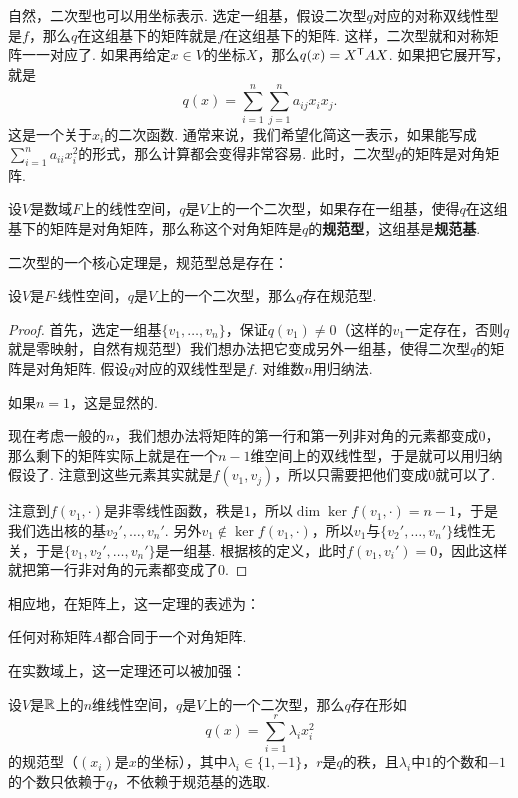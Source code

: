 自然，二次型也可以用坐标表示. 选定一组基，假设二次型$q$对应的对称双线性型是$f$，那么$q$在这组基下的矩阵就是$f$在这组基下的矩阵. 这样，二次型就和对称矩阵一一对应了. 如果再给定$x\in V$的坐标$X$，那么$q(x)=X^{\mathsf{T}} AX$. 如果把它展开写，就是
\[
    q(x)=\sum_{i=1}^n\sum_{j=1}^n a_{ij}x_ix_j.
\]
这是一个关于$x_i$的二次函数. 通常来说，我们希望化简这一表示，如果能写成$\sum_{i=1}^n a_{ii}x_i^2$的形式，那么计算都会变得非常容易. 此时，二次型$q$的矩阵是对角矩阵. 

\begin{definition}[规范型]\label{def:canonical-form}
    设$V$是数域$F$上的线性空间，$q$是$V$上的一个二次型，如果存在一组基，使得$q$在这组基下的矩阵是对角矩阵，那么称这个对角矩阵是$q$的\textbf{规范型}，这组基是\textbf{规范基}. 
\end{definition}

二次型的一个核心定理是，规范型总是存在：
\begin{theorem}\label{thm:quadratic-form-diagonalization}
    设$V$是$F$-线性空间，$q$是$V$上的一个二次型，那么$q$存在规范型. 
\end{theorem}
\begin{proof}
首先，选定一组基$\{v_1,\dots,v_n\}$，保证$q(v_1)\neq 0$（这样的$v_1$一定存在，否则$q$就是零映射，自然有规范型）我们想办法把它变成另外一组基，使得二次型$q$的矩阵是对角矩阵. 假设$q$对应的双线性型是$f$. 对维数$n$用归纳法. 

如果$n=1$，这是显然的. 

现在考虑一般的$n$，我们想办法将矩阵的第一行和第一列非对角的元素都变成$0$，那么剩下的矩阵实际上就是在一个$n-1$维空间上的双线性型，于是就可以用归纳假设了. 注意到这些元素其实就是$f(v_1,v_j)$，所以只需要把他们变成$0$就可以了. 

注意到$f(v_1,\cdot)$是非零线性函数，秩是$1$，所以$\dim\ker f(v_1,\cdot)=n-1$，于是我们选出核的基$v_2',\dots,v_n'$. 另外$v_1\notin\ker f(v_1,\cdot)$，所以$v_1$与$\{v_2',\dots,v_n'\}$线性无关，于是$\{v_1,v_2',\dots,v_n'\}$是一组基. 根据核的定义，此时$f(v_1,v_i')=0$，因此这样就把第一行非对角的元素都变成了$0$. 
\end{proof}

相应地，在矩阵上，这一定理的表述为：
\begin{corollary}\label{cor:quadratic-form-diagonalization}
任何对称矩阵$A$都合同于一个对角矩阵. 
\end{corollary}


在实数域上，这一定理还可以被加强：

\begin{theorem}[惯性定理]\label{thm:inertia-theorem}
    设$V$是$\mathbb{R}$上的$n$维线性空间，$q$是$V$上的一个二次型，那么$q$存在形如
    \[
        q(x)=\sum_{i=1}^r \lambda_i x_i^2
    \]
    的规范型（$(x_i)$是$x$的坐标），其中$\lambda_i\in\{1,-1\}$，$r$是$q$的秩，且$\lambda_i$中$1$的个数和$-1$的个数只依赖于$q$，不依赖于规范基的选取. 
\end{theorem}

